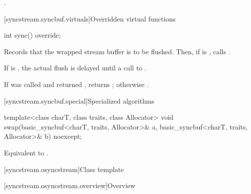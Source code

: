 \begin{itemdescr}
\pnum
\effects
{}.
\end{itemdescr}

[syncstream.syncbuf.virtuals]{Overridden virtual functions}

%
\begin{itemdecl}
int sync() override;
\end{itemdecl}

\begin{itemdescr}
\pnum
\effects
Records that the wrapped stream buffer is to be flushed.
Then, if  is , calls .
\begin{note}
If  is ,
the actual flush is delayed until a call to .
\end{note}

\pnum
\returns
If  was called and returned ,
returns ; otherwise .
\end{itemdescr}

[syncstream.syncbuf.special]{Specialized algorithms}

%
\begin{itemdecl}
template<class charT, class traits, class Allocator>
  void swap(basic_syncbuf<charT, traits, Allocator>& a,
            basic_syncbuf<charT, traits, Allocator>& b) noexcept;
\end{itemdecl}

\begin{itemdescr}
\pnum
\effects
Equivalent to .
\end{itemdescr}

[syncstream.osyncstream]{Class template }

[syncstream.osyncstream.overview]{Overview}


